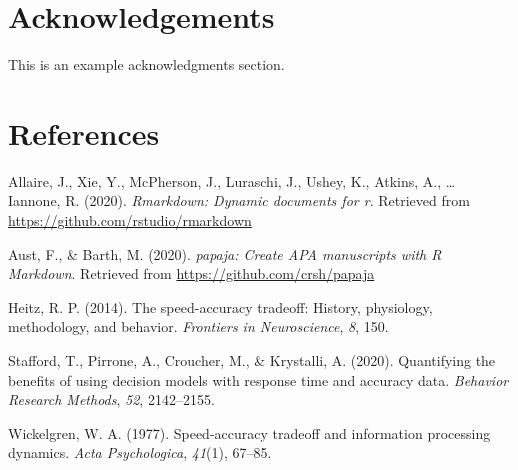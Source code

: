 \documentclass[
  english,
  ,jou,floatsintext]{apa6}
\begin{document}
\hypertarget{acknowledgements}{%
\section{Acknowledgements}\label{acknowledgements}}

This is an example acknowledgments section.

\hypertarget{references}{%
\section*{References}\label{references}}

\hypertarget{refs}{}
\leavevmode\hypertarget{ref-rmarkdowncite}{}%
Allaire, J., Xie, Y., McPherson, J., Luraschi, J., Ushey, K., Atkins, A., \ldots{} Iannone, R. (2020). \emph{Rmarkdown: Dynamic documents for r}. Retrieved from \url{https://github.com/rstudio/rmarkdown}

\leavevmode\hypertarget{ref-aust2020}{}%
Aust, F., \& Barth, M. (2020). \emph{papaja: Create APA manuscripts with R Markdown}. Retrieved from \url{https://github.com/crsh/papaja}

\leavevmode\hypertarget{ref-heitz2014speed}{}%
Heitz, R. P. (2014). The speed-accuracy tradeoff: History, physiology, methodology, and behavior. \emph{Frontiers in Neuroscience}, \emph{8}, 150.

\leavevmode\hypertarget{ref-stafford2020}{}%
Stafford, T., Pirrone, A., Croucher, M., \& Krystalli, A. (2020). Quantifying the benefits of using decision models with response time and accuracy data. \emph{Behavior Research Methods}, \emph{52}, 2142--2155.

\leavevmode\hypertarget{ref-wickelgren1977speed}{}%
Wickelgren, W. A. (1977). Speed-accuracy tradeoff and information processing dynamics. \emph{Acta Psychologica}, \emph{41}(1), 67--85.
\end{document}
